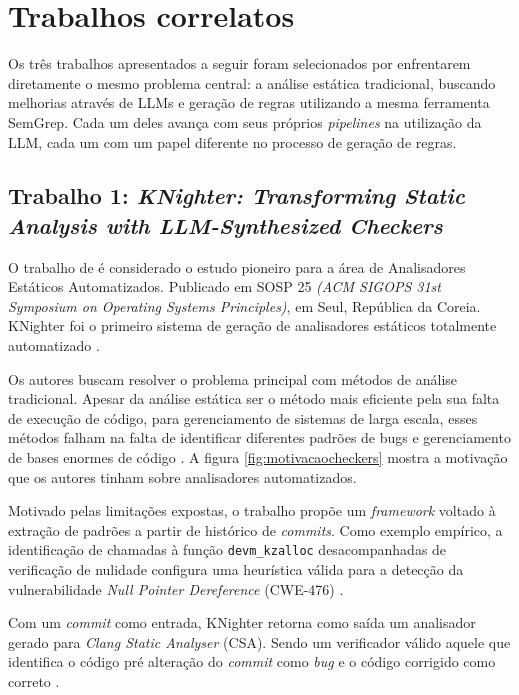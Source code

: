 \documentclass[
    12pt,                %
    openright,           %
    oneside,             %
    a4paper,             %
    english,             %
    brazil               %
]{abntex2}
\begin{document}
\section{Trabalhos correlatos}
\label{sec:trabalhosrelacionados}

Os três trabalhos apresentados a seguir foram selecionados por enfrentarem diretamente o mesmo problema central: a análise estática tradicional, buscando melhorias através de LLMs e geração de regras utilizando a mesma ferramenta SemGrep.
Cada um deles avança com seus próprios \textit{pipelines} na utilização da LLM, cada um com um papel diferente no processo de geração de regras.

\subsection{Trabalho 1: \textit{KNighter: Transforming Static Analysis with LLM-Synthesized Checkers} \cite{yang2025knighter}}
\par
O trabalho de  é considerado o estudo pioneiro para a área de Analisadores Estáticos Automatizados.
Publicado em SOSP 25 \textit{(ACM SIGOPS 31st Symposium on Operating Systems Principles)}, em Seul, República da Coreia.
KNighter foi o primeiro sistema de geração de analisadores estáticos totalmente automatizado \cite{yang2025knighter}.
\par
Os autores buscam resolver o problema principal com métodos de análise tradicional.
Apesar da análise estática ser o método mais eficiente pela sua falta de execução de código, para gerenciamento de sistemas de larga escala, esses métodos falham na falta de identificar diferentes padrões de bugs e gerenciamento de bases enormes de código \cite{yang2025knighter}.
A figura \ref{fig:motivacaocheckers} mostra a motivação que os autores tinham sobre analisadores automatizados.
\par
Motivado pelas limitações expostas, o trabalho propõe um \textit{framework} voltado à extração de padrões a partir de histórico de \textit{commits}.
Como exemplo empírico, a identificação de chamadas à função \texttt{devm\_kzalloc} desacompanhadas de verificação de nulidade configura uma heurística válida para a detecção da vulnerabilidade \textit{Null Pointer Dereference} (CWE-476) \cite{yang2025knighter}.
\par
Com um \textit{commit} como entrada, KNighter retorna como saída um analisador gerado para \textit{Clang Static Analyser} (CSA). Sendo um verificador válido aquele que identifica o código pré alteração do \textit{commit} como \textit{bug} e o código corrigido como correto \cite{yang2025knighter}.
\end{document}
